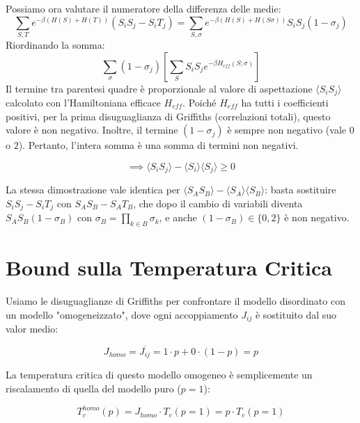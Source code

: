 \noindent Possiamo ora valutare il numeratore della differenza delle medie:
\begin{equation}
\sum_{S, T} e^{-\beta (H(S) + H(T))} (S_i S_j - S_i T_j) = \sum_{S, \sigma} e^{-\beta (H(S) + H(S\sigma))} S_i S_j (1 - \sigma_j)
\end{equation}
Riordinando la somma:
\begin{equation}
\sum_{\sigma} (1 - \sigma_j) \left[ \sum_{S} S_i S_j e^{-\beta H_{eff}(S; \sigma)} \right]
\end{equation}
Il termine tra parentesi quadre è proporzionale al valore di aspettazione $\langle S_i S_j \rangle$ calcolato con l'Hamiltoniana efficace $H_{eff}$. Poiché $H_{eff}$ ha tutti i coefficienti positivi, per la prima disuguaglianza di Griffiths (correlazioni totali), questo valore è non negativo.
Inoltre, il termine $(1 - \sigma_j)$ è sempre non negativo (vale $0$ o $2$).
Pertanto, l'intera somma è una somma di termini non negativi.

\begin{equation}
\implies \langle S_i S_j \rangle - \langle S_i \rangle \langle S_j \rangle \ge 0
\end{equation}

\noindent La stessa dimostrazione vale identica per $\langle S_A S_B \rangle - \langle S_A \rangle \langle S_B \rangle$: basta sostituire $S_i S_j - S_i T_j$ con $S_A S_B - S_A T_B$, che dopo il cambio di variabili diventa $S_A S_B (1 - \sigma_B)$ con $\sigma_B = \prod_{k \in B} \sigma_k$, e anche $(1-\sigma_B) \in \{0, 2\}$ è non negativo.

\section{Bound sulla Temperatura Critica}

Usiamo le disuguaglianze di Griffiths per confrontare il modello disordinato con un modello "omogeneizzato", dove ogni accoppiamento $J_{ij}$ è sostituito dal suo valor medio:

\begin{equation}
J_{homo} = \overline{J_{ij}} = 1 \cdot p + 0 \cdot (1-p) = p
\end{equation}

\noindent La temperatura critica di questo modello omogeneo è semplicemente un riscalamento di quella del modello puro ($p=1$):

\begin{equation}
T_c^{homo}(p) = J_{homo} \cdot T_c(p=1) = p \cdot T_c(p=1)
\end{equation}

